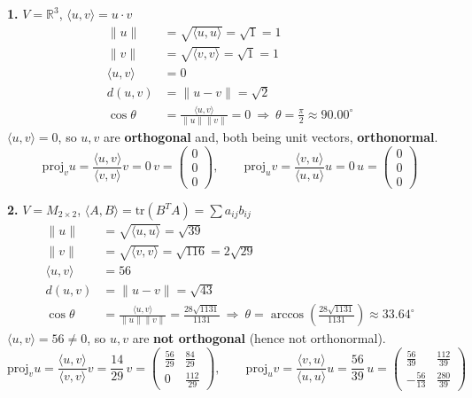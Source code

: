 \noindent\textbf{1.} $V=\mathbb{R}^3$, $\langle u,v\rangle=u\cdot v$
\begin{align*}
\|u\|&=\sqrt{\langle u,u\rangle}=\sqrt{1}=1 \\
\|v\|&=\sqrt{\langle v,v\rangle}=\sqrt{1}=1 \\
\langle u,v\rangle&=0 \\
d(u,v)&=\|u-v\|=\sqrt{2} \\
\cos\theta&=\frac{\langle u,v\rangle}{\|u\|\|v\|}=0\ \Rightarrow\ \theta=\frac{\pi}{2}\approx 90.00^\circ
\end{align*}
$\langle u,v\rangle=0$, so $u,v$ are \textbf{orthogonal} and, both being unit vectors, \textbf{orthonormal}.
\[ \mathrm{proj}_v u=\frac{\langle u,v\rangle}{\langle v,v\rangle}v=0\,v=\begin{pmatrix}0 \\ 0 \\ 0\end{pmatrix},\qquad \mathrm{proj}_u v=\frac{\langle v,u\rangle}{\langle u,u\rangle}u=0\,u=\begin{pmatrix}0 \\ 0 \\ 0\end{pmatrix} \]

\noindent\textbf{2.} $V=M_{2\times2}$, $\langle A,B\rangle=\mathrm{tr}(B^TA)=\sum a_{ij}b_{ij}$
\begin{align*}
\|u\|&=\sqrt{\langle u,u\rangle}=\sqrt{39} \\
\|v\|&=\sqrt{\langle v,v\rangle}=\sqrt{116}=2 \sqrt{29} \\
\langle u,v\rangle&=56 \\
d(u,v)&=\|u-v\|=\sqrt{43} \\
\cos\theta&=\frac{\langle u,v\rangle}{\|u\|\|v\|}=\frac{28 \sqrt{1131}}{1131}\ \Rightarrow\ \theta=\arccos{\left(\frac{28 \sqrt{1131}}{1131} \right)}\approx 33.64^\circ
\end{align*}
$\langle u,v\rangle=56\neq0$, so $u,v$ are \textbf{not orthogonal} (hence not orthonormal).
\[ \mathrm{proj}_v u=\frac{\langle u,v\rangle}{\langle v,v\rangle}v=\frac{14}{29}\,v=\begin{pmatrix}\frac{56}{29} & \frac{84}{29} \\ 0 & \frac{112}{29}\end{pmatrix},\qquad \mathrm{proj}_u v=\frac{\langle v,u\rangle}{\langle u,u\rangle}u=\frac{56}{39}\,u=\begin{pmatrix}\frac{56}{39} & \frac{112}{39} \\ - \frac{56}{13} & \frac{280}{39}\end{pmatrix} \]

